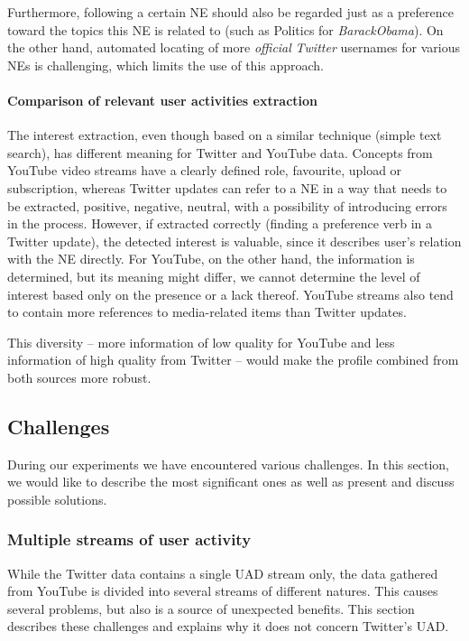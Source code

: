Furthermore, following a certain NE should also be regarded just as a preference toward the topics this NE is related to
(such as Politics for \textit{BarackObama}). On the other hand, automated locating of more \textit{official}
\textit{Twitter} usernames for various NEs is challenging, which limits the use of this approach.

\paragraph{Comparison of relevant user activities extraction}

The interest extraction, even though based on a similar technique (simple text
search), has different meaning for Twitter and YouTube data. Concepts from
YouTube video streams have a clearly defined role, \ie favourite, upload or
subscription, whereas Twitter updates can refer to a NE in a way that needs to be extracted,
\ie positive, negative, neutral, with a possibility of introducing errors in the process.
However, if extracted correctly (finding a preference verb in a Twitter update),
the detected interest is valuable, since it describes user's relation with the NE directly.
For YouTube, on the other hand, the information is determined, but its meaning might differ, \ie we
cannot determine the level of interest based only on the presence or a lack
thereof. YouTube streams also tend to contain more references to media-related
items than Twitter updates.

This diversity -- more information of low quality for YouTube and less
information of high quality from Twitter -- would make the profile combined from
both sources more robust.

\subsection{Challenges}

During our experiments we have encountered various challenges. In this section, we would like to describe
the most significant ones as well as present and discuss possible solutions.

\subsubsection{Multiple streams of user activity}

While the Twitter data contains a single UAD stream only, the data gathered from
YouTube is divided into several streams of different natures. This causes
several problems, but also is a source of unexpected benefits. This section
describes these challenges and explains why it does not concern Twitter's UAD.

